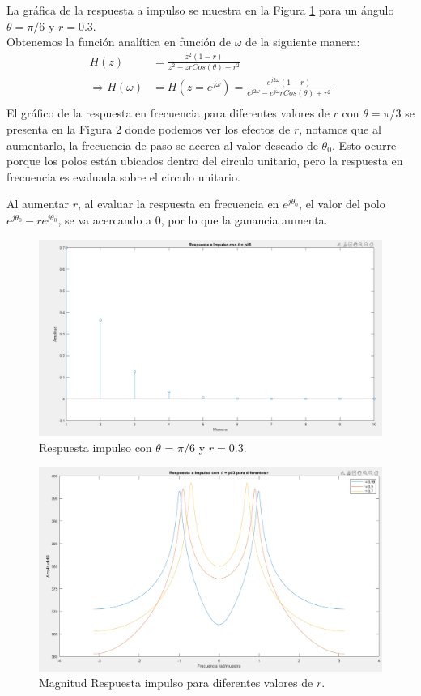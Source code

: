 \documentclass[letterpaper,onecolumn,10pt,journal,final]{IEEEtran}
\begin{document}
\begin{enumerate}[1)]
    La gráfica de la respuesta a impulso se muestra en la Figura \ref{fig:I2} para un ángulo $\theta = \pi/6 $ y $r = 0.3$. \\
    Obtenemos la función analítica en función de $\omega $ de la siguiente manera:
    \begin{equation*}
    \begin{split}
        H(z) &=\frac{z^2(1-r)}{z^2 -zrCos(\theta ) + r^2}\\
        \Rightarrow H( \omega ) &= H (z = e^{j \omega } ) = \frac{e^{j2 \omega }(1-r)}{e^{j2 \omega } -e^{j \omega }rCos( \theta ) + r^2}\\
    \end{split}
    \end{equation*}
    El gráfico de la respuesta en frecuencia para diferentes valores de $r$ con $\theta = \pi /3$ se presenta en la Figura \ref{fig:I2_2} donde podemos ver los efectos de $r$, notamos que al aumentarlo, la frecuencia de paso se acerca al valor deseado de $\theta_0$. Esto ocurre porque los polos están ubicados dentro del circulo unitario, pero la respuesta en frecuencia es evaluada sobre el circulo unitario. 
    
    Al aumentar $r$, al evaluar la respuesta en frecuencia en $e^{j\theta_0}$, el valor del polo $e^{j\theta_0}-re^{j\theta_0}$, se va acercando a $0$, por lo que la ganancia aumenta.
    
    \begin{figure}[H]
        \centering
        \includegraphics[width=0.75 \linewidth]{Figuras/I_2)_RespuestaImpulso.png}
        \caption{Respuesta impulso con $\theta$ = $\pi /6$ y $r = 0.3$.}
        \label{fig:I2}
    \end{figure}
    \begin{figure}[H]
        \centering
        \includegraphics[width=0.75 \linewidth]{Figuras/I_2)_MagH(w).png}
        \caption{Magnitud Respuesta impulso para diferentes valores de $r$.}
        \label{fig:I2_2}
    \end{figure}
    

\end{enumerate}
\end{document}
